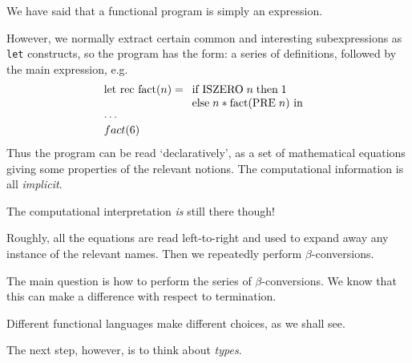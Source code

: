 \begin{slide*}


\vspace*{0.5cm}

We have said that a functional program is simply an expression.

However, we normally extract certain common and interesting subexpressions as
{\red \tt let} constructs, so the program has the form: a series of
definitions, followed by the main expression, e.g.
{\red $$\begin{array}[t]{l} \mbox{let rec fact}(n) = \begin{array}[t]{l} \mbox{if ISZERO}\; n\; \mbox{then}\;1\\
                                \mbox{else}\; n * \mbox{fact}(\mbox{PRE}\; n)
                        \mbox{ in } \end{array} \\
       \cdots\\
       fact(6)
   \end{array}
$$}
Thus the program can be read `declaratively', as a set of mathematical
equations giving some properties of the relevant notions. The computational
information is all {\em implicit}.

\end{slide*}



\begin{slide*}


\vspace*{0.5cm}

The computational interpretation {\em is} still there though!

Roughly, all the equations are read left-to-right and used to expand away any
instance of the relevant names. Then we repeatedly perform $\beta$-conversions.

The main question is how to perform the series of $\beta$-conversions. We know
that this can make a difference with respect to termination.

Different functional languages make different choices, as we shall see.

The next step, however, is to think about {\em types}.

\end{slide*}




